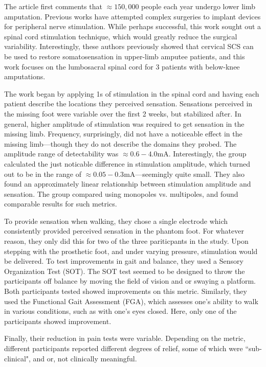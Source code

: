 The article first comments that $\approx 150,000$ people each year undergo lower limb amputation. Previous works have attempted complex surgeries to implant devices for peripheral nerve stimulation. While perhaps successful, this work sought out a spinal cord stimulation technique, which would greatly reduce the surgical variability. Interestingly, these authors previously showed that cervical SCS can be used to restore somatosensation in upper-limb amputee patients, and this work focuses on the lumbosacral spinal cord for 3 patients with below-knee amputations.\newline

The work began by applying 1s of stimulation in the spinal cord and having each patient describe the locations they perceived sensation. Sensations perceived in the missing foot were variable over the first 2 weeks, but stabilized after. In general, higher amplitude of stimulation was required to get sensation in the missing limb. Frequency, surprisingly, did not have a noticeable effect in the missing limb---though they do not describe the domains they probed. The amplitude range of detectability was $\approx 0.6 - 4.0$mA. Interestingly, the group calculated the just noticable difference in stimulation amplitude, which turned out to be in the range of $\approx 0.05 - 0.3$mA---seemingly quite small. They also found an approximately linear relationship between stimulation amplitude and sensation. The group compared using monopoles vs. multipoles, and found comparable results for such metrics.\newline

To provide sensation when walking, they chose a single electrode which consistently provided perceived sensation in the phantom foot. For whatever reason, they only did this for two of the three pariticpants in the study. Upon stepping with the prosthetic foot, and under varying pressure, stimulation would be delivered. To test improvements in gait and balance, they used a Sensory Organization Test (SOT). The SOT test seemed to be designed to throw the participants off balance by moving the field of vision and or swaying a platform. Both participants tested showed improvements on this metric. Similarly, they used the Functional Gait Assessment (FGA), which assesses one's ability to walk in various conditions, such as with one's eyes closed. Here, only one of the participants showed improvement.\newline

Finally, their reduction in pain tests were variable. Depending on the metric, different participants reported different degrees of relief, some of which were ``sub-clinical", and or, not clinically meaningful.\newline

